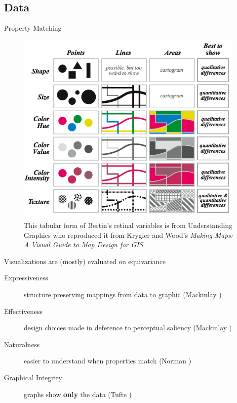 \subsection{Data}


\begin{frame}{Property Matching}
    \begin{figure}
        \includegraphics[width=.7\textwidth]{figures/intro/retinal_variables.png}
        \caption{This tabular form of Bertin's retinal variables is from Understanding Graphics \cite{malamedInformationDisplayTips2010} who reproduced it from Krygier and Wood's \textit{Making Maps: A Visual Guide to Map Design for GIS}\cite{krygierMakingMapsVisual2005}}
    \end{figure}
\end{frame}

\begin{frame}{Visualizations are (mostly) evaluated on equivariance}
    \begin{description}
        \item[Expressiveness] structure preserving mappings from data to graphic (Mackinlay \cite{mackinlayAutomatingDesignGraphical1986})
        \item[Effectiveness] design choices made in deference to perceptual saliency (Mackinlay \cite{clevelandResearchStatisticalGraphics1987,clevelandGraphicalPerceptionTheory1984,chambersGraphicalMethodsData1983a, munznerVisualizationAnalysisDesign2014})
        \item[Naturalness] easier to understand when properties match (Norman \cite{norman_things_smart})
        \item[Graphical Integrity] graphs show \textbf{only} the data (Tufte \cite{tufteVisualDisplayQuantitative2001})
    \end{description}
\end{frame}


